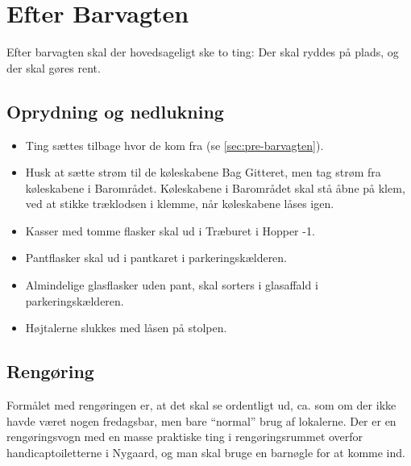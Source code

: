 \section{Efter Barvagten}
\label{sec:post-barvagten}

Efter barvagten skal der hovedsageligt ske to ting: Der skal ryddes på
plads, og der skal gøres rent.

\subsection{Oprydning og nedlukning}
\label{sec:post:oprydning}

\begin{itemize}
	\item Ting sættes tilbage hvor de kom fra (se
	\autoref{sec:pre-barvagten}).
	\item Husk at sætte strøm til de køleskabene Bag Gitteret,
	men tag strøm fra køleskabene i Barområdet.
	Køleskabene i Barområdet skal stå åbne på klem,
	ved at stikke træklodsen i klemme, når køleskabene låses igen.
	\item Kasser med tomme flasker skal ud i Træburet i Hopper -1.
	\item Pantflasker skal ud i pantkaret i parkeringskælderen.
	\item Almindelige glasflasker uden pant, skal sorters i glasaffald i parkeringskælderen.
	\item Højtalerne slukkes med låsen på stolpen.
\end{itemize}

\subsection{Rengøring}
\label{sec:post:rengoring}

Formålet med rengøringen er, at det skal se ordentligt ud, ca. som om
der ikke havde været nogen fredagsbar, men bare ``normal'' brug af
lokalerne. Der er en rengøringsvogn med en masse praktiske ting i
rengøringsrummet overfor handicaptoiletterne i Nygaard,
og man skal bruge en barnøgle for at komme ind.

